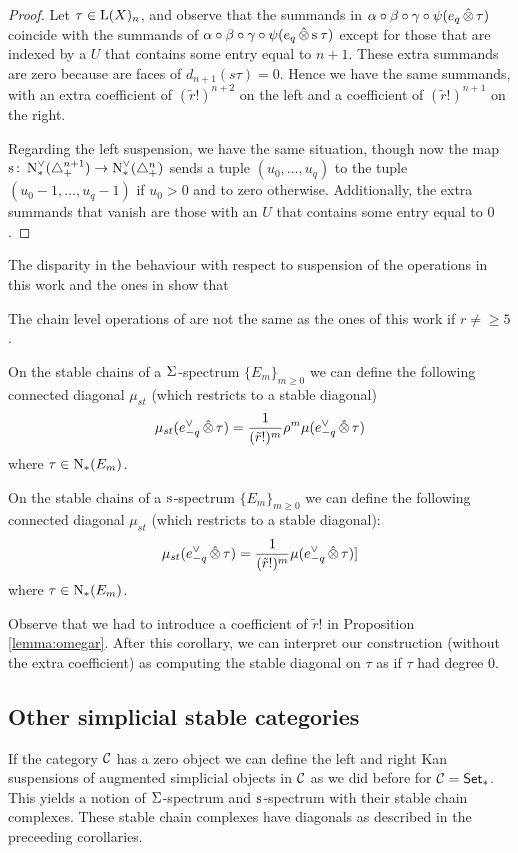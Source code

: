 \begin{proof}
 Let $\tau\in \operatorname{L}(X)_n$, and observe that the summands in $\alpha\circ\beta\circ\gamma\circ \psi(e_q \operatorname{\hat{\otimes}} \tau)$ coincide with the summands of $\alpha\circ\beta\circ\gamma\circ \psi(e_q \operatorname{\hat{\otimes}} \operatorname{s}^{}\tau)$ except for those that are indexed by a $U$ that contains some entry equal to $n+1$. These extra summands are zero because are faces of $d_{n+1}(s{} \tau) = 0$. Hence we have the same summands, with an extra coefficient of $(\tilde{r}!)^{n+2}$ on the left and a coefficient of $(\tilde{r}!)^{n+1}$ on the right.

 Regarding the left suspension, we have the same situation, though now the map $\operatorname{s}^{} \colon \operatorname{N}^\vee_{*}(\triangle_{+}^{n+1}) \to \operatorname{N}^\vee_{*}(\triangle_{+}^{n})$ sends a tuple $(u_0,\dots,u_q)$ to the tuple $(u_0-1,\dots,u_q-1)$ if $u_0>0$ and to zero otherwise. Additionally, the extra summands that vanish are those with an $U$ that contains some entry equal to $0$.
\end{proof}
The disparity in the behaviour with respect to suspension of the operations in this work and the ones in \cite{medina2021may_st} show that
\begin{corollary}
	The chain level operations of \cite{medina2021may_st} are not the same as the ones of this work if $r\neq \geq 5$.
\end{corollary}

\begin{corollary}
 On the stable chains of a $\Sigma^{}$-spectrum $\{E_m\}_{m \geq 0}$ we can define the following connected diagonal $\mu_{st}$ (which restricts to a stable diagonal)
 \[
 \mu_{st}(e_{-q}^\vee \operatorname{\hat{\otimes}} \tau) = \frac{1}{(\tilde{r}!)^{m}}\rho^m \mu(e_{-q}^\vee \operatorname{\hat{\otimes}} \tau)
 \]
 where $\tau\in \operatorname{N}_{*}(E_m)$.
\end{corollary}

\begin{corollary}
 On the stable chains of a $\operatorname{s}^{}$-spectrum $\{E_m\}_{m \geq 0}$ we can define the following connected diagonal $\mu_{st}$ (which restricts to a stable diagonal):
 \[
 \mu_{st}(e_{-q}^\vee \operatorname{\hat{\otimes}} \tau) = \frac{1}{(\tilde{r}!)^m}\mu(e_{-q}^\vee \operatorname{\hat{\otimes}} \tau)]
 \]
 where $\tau\in\operatorname{N}_{*}(E_m)$.
\end{corollary}
Observe that we had to introduce a coefficient of $\tilde{r}!$ in Proposition \ref{lemma:omegar}. After this corollary, we can interpret our construction (without the extra coefficient) as computing the stable diagonal on $\tau$ as if $\tau$ had degree $0$.

\subsection{Other simplicial stable categories}

If the category $\mathcal{C}$ has a zero object we can define the left and right Kan suspensions of augmented simplicial objects in $\mathcal{C}$ as we did before for $\mathcal{C} = \mathsf{Set}_*$. This yields a notion of $\Sigma^{}$-spectrum and $\operatorname{s}^{}$-spectrum with their stable chain complexes. These stable chain complexes have diagonals as described in the preceeding corollaries.
